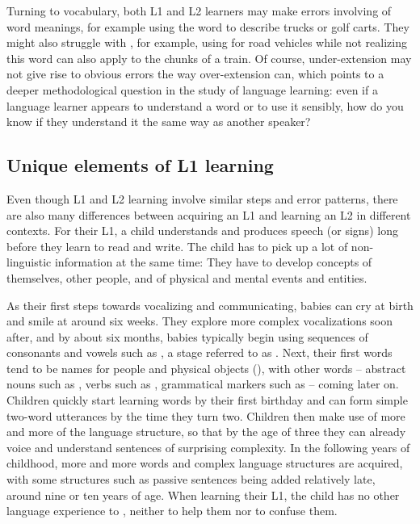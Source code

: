 Turning to vocabulary, both L1 and L2 learners may make errors
involving  of word meanings, for example
using the word  to describe trucks or golf carts.  They
might also struggle with , for example, using
 for road vehicles while not realizing this word can also
apply to the chunks of a train.  Of course, under-extension may not
give rise to obvious errors the way over-extension can, which points
to a deeper methodological question in the study of language learning:
even if a language learner appears to understand a word or to use it
sensibly, how do you know if they understand it the same way as
another speaker?

\subsection{Unique elements of L1 learning}

Even though L1 and L2 learning involve similar steps and error
patterns, there are also many differences between acquiring an L1 and
learning an L2 in different contexts.  For their L1, a child
understands and produces speech (or signs) long before they learn to
read and write.  The child has to pick up a lot of non-linguistic
information at the same time: They have to develop concepts of
themselves, other people, and of physical and mental events and
entities.  

As their first steps towards vocalizing and communicating, babies can
 cry at birth and smile at around six weeks.  They explore more
 complex vocalizations soon after, and by about six months, babies
 typically begin using sequences of consonants and vowels such as
 , a stage referred to as . Next,
 their first words tend to be names for people and physical objects
 (), with other words -- abstract nouns such as
 , verbs such as , grammatical markers
 such as  -- coming later on.  Children quickly start
 learning words by their first birthday and can form simple two-word
 utterances by the time they turn two.  Children then make use of more
 and more of the language structure, so that by the age of three they
 can already voice and understand sentences of surprising
 complexity. In the following years of childhood, more and more words
 and complex language structures are acquired, with some structures
 such as passive sentences being added relatively late, around nine or
 ten years of age.  When learning their L1, the child has no other
 language experience to , neither to help them nor
 to confuse them.



